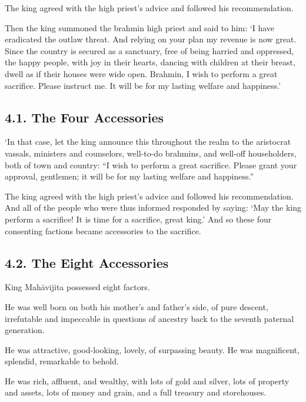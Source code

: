 \documentclass[12pt,openany]{book}%
\begin{document}
The king agreed with the high priest’s advice and followed his recommendation. 

Then the king summoned the brahmin high priest and said to him: ‘I have eradicated the outlaw threat. And relying on your plan my revenue is now great. Since the country is secured as a sanctuary, free of being harried and oppressed, the happy people, with joy in their hearts, dancing with children at their breast, dwell as if their houses were wide open. Brahmin, I wish to perform a great sacrifice. Please instruct me. It will be for my lasting welfare and happiness.’ 

\subsection*{4.1. The Four Accessories }

‘In that case, let the king announce this throughout the realm to the aristocrat vassals, ministers and counselors, well-to-do brahmins, and well-off householders, both of town and country: “I wish to perform a great sacrifice. Please grant your approval, gentlemen; it will be for my lasting welfare and happiness.” 

The king agreed with the high priest’s advice and followed his recommendation. And all of the people who were thus informed responded by saying: ‘May the king perform a sacrifice! It is time for a sacrifice, great king.’ And so these four consenting factions became accessories to the sacrifice. 

\subsection*{4.2. The Eight Accessories }

King \textsanskrit{Mahāvijita} possessed eight factors. 

He was well born on both his mother’s and father’s side, of pure descent, irrefutable and impeccable in questions of ancestry back to the seventh paternal generation. 

He was attractive, good-looking, lovely, of surpassing beauty. He was magnificent, splendid, remarkable to behold. 

He was rich, affluent, and wealthy, with lots of gold and silver, lots of property and assets, lots of money and grain, and a full treasury and storehouses. 
\end{document}
